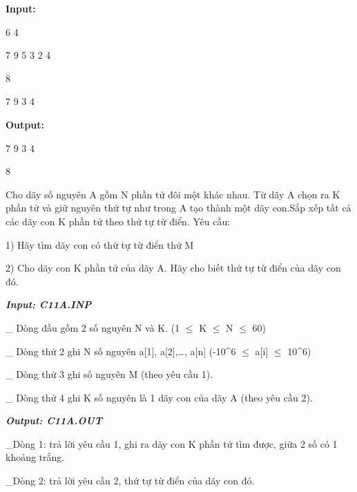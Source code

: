 \textbf{    Input:   }

   6 4  

   7 9 5 3 2 4  

   8  

   7 9 3 4  



\textbf{    Output:   }



   7 9 3 4  

   8  



    Cho dãy số nguyên A gồm N phần tử đôi một khác nhau. Từ dãy A chọn ra K phần tử và giữ nguyên thứ tự như trong A tạo thành một dãy con.Sắp xếp tất cả các dãy con K phần tử theo thứ tự từ điển. Yêu cầu:   

    1) Hãy tìm dãy con có thứ tự từ điển thứ M   

    2) Cho dãy con K phần tử của dãy A. Hãy cho biết thứ tự từ điển của dãy con đó.   

\textbf{\emph{      Input: C11A.INP     }}

    \_ Dòng đầu gồm 2 số nguyên N và K. (1  $\le$  K  $\le$  N  $\le$  60)   

    \_ Dòng thứ 2 ghi N số nguyên a[1], a[2],…, a[n] (-10^6  $\le$  a[i]  $\le$  10^6)   

    \_ Dòng thứ 3 ghi số nguyên M (theo yêu cầu 1).   

    \_ Dòng thứ 4 ghi K số nguyên là 1 dãy con của dãy A (theo yêu cầu 2).   

\textbf{\emph{      Output: C11A.OUT     }}

    \_Dòng 1: trả lời yêu cầu 1, ghi ra dãy con K phần tử tìm được, giữa 2 số có 1 khoảng trắng.   

    \_Dòng 2: trả lời yêu cầu 2, thứ tự từ điển của dãy con đó.   

